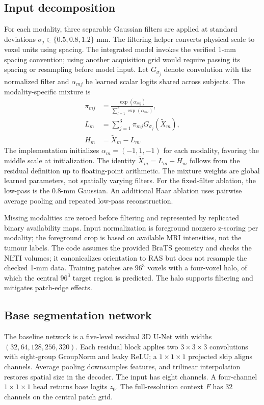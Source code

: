 \documentclass[conference]{IEEEtran}
\begin{document}
\subsection{Input decomposition}
For each modality, three separable Gaussian filters are applied at standard deviations $\sigma_j\in\{0.5,0.8,1.2\}$ mm. The filtering helper converts physical scale to voxel units using spacing. The integrated model invokes the verified $1$-mm spacing convention; using another acquisition grid would require passing its spacing or resampling before model input. Let $G_{\sigma_j}$ denote convolution with the normalized filter and $\alpha_{mj}$ be learned scalar logits shared across subjects. The modality-specific mixture is
\begin{align}
\pi_{mj}&=\frac{\exp(\alpha_{mj})}{\sum_{l=1}^{3}\exp(\alpha_{ml})},\\
L_m&=\sum_{j=1}^{3}\pi_{mj}G_{\sigma_j}(\tilde X_m),\\
H_m&=\tilde X_m-L_m.
\label{eq:split}
\end{align}
The implementation initializes $\alpha_m=(-1,1,-1)$ for each modality, favoring the middle scale at initialization. The identity $\tilde X_m=L_m+H_m$ follows from the residual definition up to floating-point arithmetic. The mixture weights are global learned parameters, not spatially varying filters. For the fixed-filter ablation, the low-pass is the $0.8$-mm Gaussian. An additional Haar ablation uses pairwise average pooling and repeated low-pass reconstruction.

Missing modalities are zeroed before filtering and represented by replicated binary availability maps. Input normalization is foreground nonzero z-scoring per modality; the foreground crop is based on available MRI intensities, not the tumour labels. The code assumes the provided BraTS geometry and checks the NIfTI volumes; it canonicalizes orientation to RAS but does not resample the checked 1-mm data. Training patches are $96^3$ voxels with a four-voxel halo, of which the central $96^3$ target region is predicted. The halo supports filtering and mitigates patch-edge effects.

\subsection{Base segmentation network}
The baseline network is a five-level residual 3D U-Net with widths $(32,64,128,256,320)$. Each residual block applies two $3\times3\times3$ convolutions with eight-group GroupNorm and leaky ReLU; a $1\times1\times1$ projected skip aligns channels. Average pooling downsamples features, and trilinear interpolation restores spatial size in the decoder. The input has eight channels. A four-channel $1\times1\times1$ head returns base logits $z_0$. The full-resolution context $F$ has 32 channels on the central patch grid.
\end{document}
